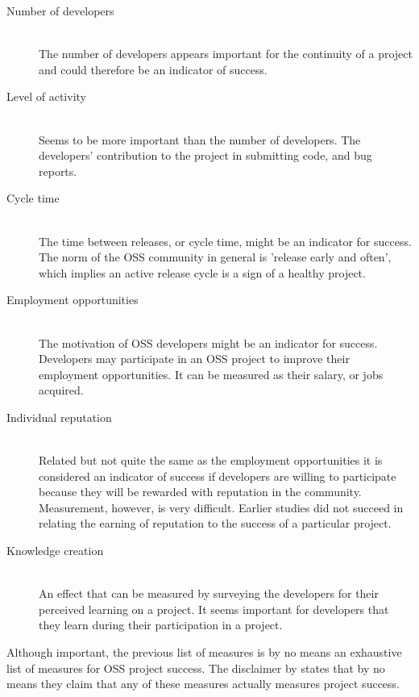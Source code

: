\begin{description}
	\item[Number of developers] \hfill \\ The number of developers appears
		important for the continuity of a project and could therefore be an indicator
		of success.

	\item[Level of activity] \hfill \\ Seems to be more important than the number
		of developers. The developers' contribution to the project in submitting code,
		and bug reports.

	\item[Cycle time] \hfill \\ The time between releases, or cycle time, might
		be an indicator for success. The norm of the OSS community in general is
		'release early and often', which implies an active release cycle is a sign of
		a healthy project.

	\item[Employment opportunities] \hfill \\ The motivation of OSS developers
		might be an indicator for success. Developers may participate in an OSS
		project to improve their employment opportunities. It can be measured as
		their salary, or jobs acquired.

	\item[Individual reputation] \hfill \\ Related but not quite the same as
		the employment opportunities it is considered an indicator of success if
		developers are willing to participate because they will be rewarded with
		reputation in the community. Measurement, however, is very difficult. Earlier
		studies did not succeed in relating the earning of reputation to the
		success of a particular project.

	\item[Knowledge creation] \hfill \\ An effect that can be measured by
		surveying the developers for their perceived learning on a project. It seems
		important for developers that they learn during their participation in a
		project.
\end{description}

\noindent
Although important, the previous list of measures is by no means an exhaustive
list of measures for OSS project success. The disclaimer by \citet{crowston2003}
states that by no means they claim that any of these measures actually measures
project success.

